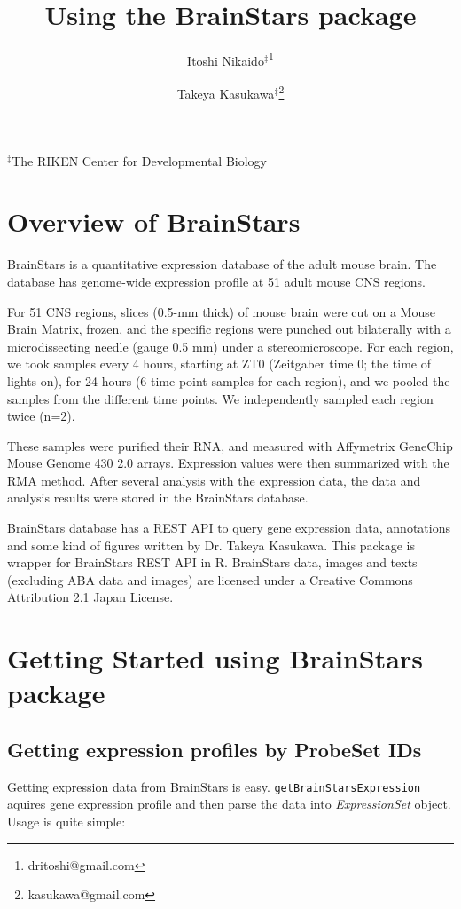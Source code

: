 \documentclass[12pt,fullpage]{article}
\author{Itoshi Nikaido$^\ddagger$\footnote{dritoshi@gmail.com} \and Takeya Kasukawa$^\ddagger$\footnote{kasukawa@gmail.com}}
\newcommand{\Rfunction}[1]{{\texttt{#1}}}
\newcommand{\Rclass}[1]{{\textit{#1}}}
\begin{document}
\title{Using the BrainStars package}
\maketitle
\begin{center}$^\ddagger$The RIKEN Center for Developmental Biology
\end{center}

\tableofcontents

\section{Overview of BrainStars} 

BrainStars is a quantitative expression database of the adult
mouse brain. The database has genome-wide expression profile at 51
adult mouse CNS regions.

For 51 CNS regions, slices (0.5-mm thick) of mouse brain were cut on a
Mouse Brain Matrix, frozen, and the specific regions were punched out
bilaterally with a microdissecting needle (gauge 0.5 mm) under a
stereomicroscope. For each region, we took samples every 4 hours,
starting at ZT0 (Zeitgaber time 0; the time of lights on), for 24
hours (6 time-point samples for each region), and we pooled the
samples from the different time points. We independently sampled each
region twice (n=2).

These samples were purified their RNA, and measured with Affymetrix
GeneChip Mouse Genome 430 2.0 arrays. Expression values were then
summarized with the RMA method. After several analysis with the
expression data, the data and analysis results were stored in the
BrainStars database.

BrainStars database has a REST API to query gene expression data, 
annotations and some kind of figures written by Dr. Takeya Kasukawa. 
This package is wrapper for BrainStars REST API in R. BrainStars data, 
images and texts (excluding ABA data and images) are licensed under a 
Creative Commons Attribution 2.1 Japan License.
  
\section{Getting Started using BrainStars package}
\subsection{Getting expression profiles by ProbeSet IDs}
Getting expression data from BrainStars is easy.  \Rfunction{getBrainStarsExpression} 
aquires gene expression profile and then parse the data into \Rclass{ExpressionSet} 
object.  Usage is quite simple:
\end{document}
